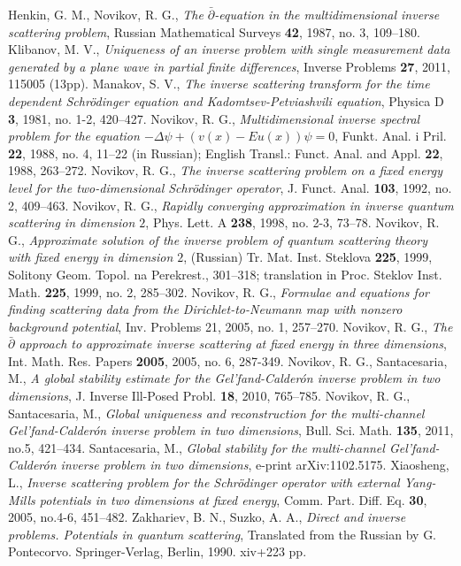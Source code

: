 \documentclass[11pt,a4paper,english,subeqn]{amsart}
\theoremstyle{plain}
\theoremstyle{definition}
\numberwithin{equation}{section}
\begin{document}
\begin{thebibliography}{99}
 Henkin, G. M., Novikov, R. G., \textit{The $ \bar\partial$-equation in the multidimensional inverse scattering problem}, Russian Mathematical Surveys \textbf{42}, 1987, no. 3, 109--180.
 Klibanov, M. V., \textit{Uniqueness of an inverse problem with single measurement data generated by a plane wave in partial finite differences}, Inverse Problems \textbf{27}, 2011, 115005 (13pp).
 Manakov, S. V., \textit{The inverse scattering transform for the time
dependent Schr\"odinger equation and Kadomtsev-Petviashvili equation},
Physica D \textbf{3}, 1981, no. 1-2, 420--427.
 Novikov, R. G., \textit{Multidimensional inverse spectral problem for the equation $-\Delta \psi +
(v(x) - Eu(x))\psi = 0$}, Funkt. Anal. i Pril. \textbf{22}, 1988, no. 4, 11--22 (in Russian); English
Transl.: Funct. Anal. and Appl. \textbf{22}, 1988, 263--272.
 Novikov, R. G., \textit{The inverse scattering problem on a fixed energy level for the two-dimensional Schr\"odinger operator}, J. Funct. Anal. \textbf{103}, 1992, no. 2, 409--463.
 Novikov, R. G., \textit{Rapidly converging approximation in inverse quantum scattering in dimension $2$},  Phys. Lett. A  \textbf{238}, 1998,  no. 2-3, 73--78.
 Novikov, R. G., \textit{Approximate solution of the inverse problem of quantum scattering theory with fixed energy in dimension $2$}, (Russian)  Tr. Mat. Inst. Steklova  \textbf{225}, 1999,  Solitony Geom. Topol. na Perekrest., 301--318;  translation in  Proc. Steklov Inst. Math.  \textbf{225}, 1999,  no. 2, 285--302.
 Novikov, R. G., \textit{Formulae and equations for finding scattering data from the Dirichlet-to-Neumann map with nonzero background potential}, Inv. Problems 21, 2005, no. 1, 257--270.
 Novikov, R. G., \textit{The $\bar \partial$ approach to approximate inverse
scattering at fixed energy in three dimensions}, Int. Math. Res. Papers \textbf{2005}, 2005, no. 6, 287-349.
 Novikov, R. G., Santacesaria, M., \textit{A global stability estimate for the Gel'fand-Calder\'on inverse problem in two dimensions}, J. Inverse Ill-Posed Probl. \textbf{18}, 2010, 765--785.
 Novikov, R. G., Santacesaria, M., \textit{Global uniqueness and reconstruction for the multi-channel Gel'fand-Calder\'on inverse problem in two dimensions}, Bull. Sci. Math. \textbf{135}, 2011, no.5, 421--434.
 Santacesaria, M., \textit{Global stability for the multi-channel Gel'fand-Calder\'on inverse problem in two dimensions}, e-print arXiv:1102.5175.
 Xiaosheng, L., \textit{Inverse scattering problem for the Schr\"odinger operator with external Yang-Mills potentials in two dimensions at fixed energy}, Comm. Part. Diff. Eq. \textbf{30}, 2005, no.4-6, 451--482.
 Zakhariev, B. N., Suzko, A. A., \textit{Direct and inverse problems. Potentials in quantum scattering}, Translated from the Russian by G. Pontecorvo. Springer-Verlag, Berlin, 1990. xiv+223 pp.
\end{thebibliography}
\end{document}
